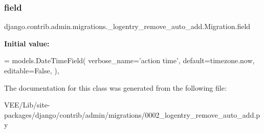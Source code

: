 \subsubsection{\texorpdfstring{field}{field}}
{\footnotesize\ttfamily django.\+contrib.\+admin.\+migrations.\+\_\+logentry\+\_\+remove\+\_\+auto\+\_\+add.\+Migration.\+field\hspace{0.3cm}{\ttfamily [static]}}

{\bfseries Initial value\+:}
\begin{DoxyCode}
= models.DateTimeField(
                verbose\_name=\textcolor{stringliteral}{'action time'},
                default=timezone.now,
                editable=\textcolor{keyword}{False},
            ),
\end{DoxyCode}


The documentation for this class was generated from the following file\+:\begin{DoxyCompactItemize}
\item 
V\+E\+E/\+Lib/site-\/packages/django/contrib/admin/migrations/0002\+\_\+logentry\+\_\+remove\+\_\+auto\+\_\+add.\+py\end{DoxyCompactItemize}

